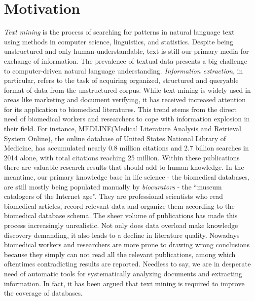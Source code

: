 \section{Motivation}\label{section1.1} %
\emph{Text mining} is the process of searching for patterns in natural language text using methods in computer science, linguistics, and statistics. Despite being unstructured and only human-understandable, text is still our primary media for exchange of information\cite{witten2005text}. The prevalence of textual data presents a big challenge to computer-driven natural language understanding. \emph{Information extraction}, in particular, refers to the task of acquiring organized, structured and queryable format of data from the unstructured corpus. \newline\newline
While text mining is widely used in areas like marketing and document verifying, it has received increased attention for its application to biomedical literatures\cite{kim2003genia,ananiadou2006text,krallinger2005text}. This trend stems from the direct need of biomedical workers and researchers to cope with information explosion in their field. For instance, MEDLINE(Medical Literature Analysis and Retrieval System Online), the online database of United States National Library of Medicine, has accumulated nearly 0.8 million citations and 2.7 billion searches in 2014 alone\cite{MEDLINE:2015:Online}, with total citations reaching 25 million. Within these publications there are valuable research results that should add to human knowledge. In the meantime,  our primary knowledge base in life science - the biomedical databases, are still mostly being populated manually by \emph{biocurators} - the ``museum catalogers of the Internet age''\cite{wiki:biocurators}. They are professional scientists who read biomedical articles, record relevant data and organize them according to the biomedical database schema. The sheer volume of publications has made this process increasingly unrealistic\cite{cohen2005survey}.\newline\newline
Not only does data overload make knowledge discovery demanding, it also leads to a decline in literature quality. Nowadays biomedical workers and researchers are more prone to drawing wrong conclusions because they simply can not read all the relevant publications, among which oftentimes contradicting results are reported. Needless to say, we are in desperate need of automatic tools for systematically analyzing documents and extracting information. In fact, it has been argued that text mining is required to improve the coverage of databases\cite{baumgartner2007manual}.


